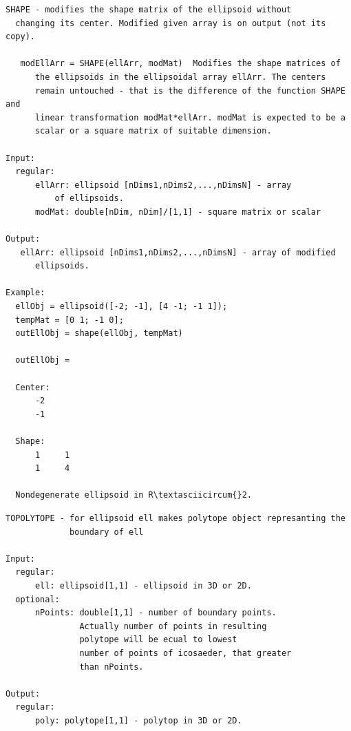 \documentclass[letterpaper,10pt,english]{sphinxmanual}
\begin{document}
\begin{Verbatim}[commandchars=\\\{\}]
SHAPE - modifies the shape matrix of the ellipsoid without
  changing its center. Modified given array is on output (not its copy).

   modEllArr = SHAPE(ellArr, modMat)  Modifies the shape matrices of
      the ellipsoids in the ellipsoidal array ellArr. The centers
      remain untouched - that is the difference of the function SHAPE and
      linear transformation modMat*ellArr. modMat is expected to be a
      scalar or a square matrix of suitable dimension.

Input:
  regular:
      ellArr: ellipsoid [nDims1,nDims2,...,nDimsN] - array
          of ellipsoids.
      modMat: double[nDim, nDim]/[1,1] - square matrix or scalar

Output:
   ellArr: ellipsoid [nDims1,nDims2,...,nDimsN] - array of modified
      ellipsoids.

Example:
  ellObj = ellipsoid([-2; -1], [4 -1; -1 1]);
  tempMat = [0 1; -1 0];
  outEllObj = shape(ellObj, tempMat)

  outEllObj =

  Center:
      -2
      -1

  Shape:
      1     1
      1     4

  Nondegenerate ellipsoid in R\textasciicircum{}2.
\end{Verbatim}

\begin{Verbatim}[commandchars=\\\{\}]
TOPOLYTOPE - for ellipsoid ell makes polytope object represanting the
             boundary of ell

Input:
  regular:
      ell: ellipsoid[1,1] - ellipsoid in 3D or 2D.
  optional:
      nPoints: double[1,1] - number of boundary points.
               Actually number of points in resulting
               polytope will be ecual to lowest
               number of points of icosaeder, that greater
               than nPoints.

Output:
  regular:
      poly: polytope[1,1] - polytop in 3D or 2D.
\end{Verbatim}
\end{document}
